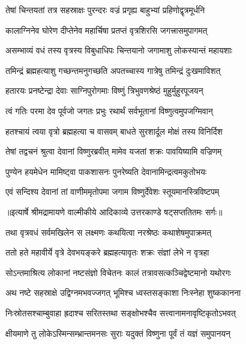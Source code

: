 \twolineshloka
{तेषां चिन्तयतां तत्र सहस्राक्षः पुरन्दरः}
{वज्रं प्रगृह्य बाहुभ्यां प्रहिणोद्वृत्रमूर्धनि} %

\twolineshloka
{कालाग्निनेव घोरेण दीप्तेनेव महार्चिषा}
{प्रतप्तं वृत्रशिरसि जगत्त्रासमुपागमत्} %

\twolineshloka
{असम्भाव्यं वधं तस्य वृत्रस्य विबुधाधिपः}
{चिन्तयानो जगामाशु लोकस्यान्तं महायशाः} %

\twolineshloka
{तमिन्द्रं ब्रह्महत्याशु गच्छन्तमनुगच्छति}
{अपतच्चास्य गात्रेषु तमिन्द्रं दुःखमाविशत्} %

\twolineshloka
{हतारयः प्रनष्टेन्द्रा देवाः साग्निपुरोगमाः}
{विष्णुं त्रिभुवणश्रेष्ठं मुहुर्मुहुरपूजयन्} %

\twolineshloka
{त्वं गतिः परमा देव पूर्वजो जगतः प्रभुः}
{रथार्थं सर्वभूतानां विष्णुत्वमुपजग्मिवान्} %

\twolineshloka
{हतश्चायं त्वया वृत्रो ब्रह्महत्या च वासवम्}
{बाधते सुरशार्दूल मोक्षं तस्य विनिर्दिश} %

\twolineshloka
{तेषां तद्वचनं श्रुत्वा देवानां विष्णुरब्रवीत्}
{मामेव यजतां शक्रः पावयिष्यामि वज्रिणम्} %

\twolineshloka
{पुण्येन हयमेधेन मामिष्ट्वा पाकशासनः}
{पुनरेष्यति देवानामिन्द्रत्वमकुतोभयः} %

\twolineshloka
{एवं सन्दिश्य देवानां तां वाणीममृतोपमा}
{जगाम विष्णुर्देवेशः स्तूयमानस्त्रिविष्टपम्} %


{॥इत्यार्षे श्रीमद्रामायणे वाल्मीकीये आदिकाव्ये उत्तरकाण्डे षट्सप्ततितमः सर्गः॥}


\twolineshloka
{तथा वृत्रवधं सर्वमखिलेन स लक्ष्मणः}
{कथयित्वा नरश्रेष्ठः कथाशेषमुपाक्रमत्} %

\twolineshloka
{ततो हते महावीर्ये वृत्रे देवभयङ्करे}
{ब्रह्महत्यावृतः शक्रः संज्ञां लेभे न वृत्रहा} %

\twolineshloka
{सोऽन्तमाश्रित्य लोकानां नष्टसंज्ञो विचेतनः}
{कालं तत्रावसत्कञ्चिद्वेष्टमानो यथोरगः} %

\twolineshloka
{अथ नष्टे सहस्राक्षे उद्विग्नमभवज्जगत्}
{भूमिश्च ध्वस्तसङ्काशा निःस्नेहा शुष्ककानना} %

\twolineshloka
{निःस्रोतसश्चाम्बुवाहा ह्रदाश्च सरितस्तथा}
{सङ्क्षोभश्चैव सत्त्वानामनावृष्टिकृतोऽभवत्} %

\twolineshloka
{क्षीयमाणे तु लोकेऽस्मिन्सम्भ्रान्तमनसः सुराः}
{यदुक्तं विष्णुना पूर्वं तं यज्ञं समुपानयन्} %


